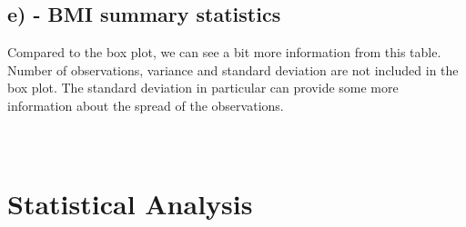 \documentclass{memoir}
\begin{document}
\section{e) - BMI summary statistics}

\begin{table}[!h]
\centering
\caption{BMI score summary statistics table}
\label{table 1.4}
\end{table}
Compared to the box plot, we can see a bit more information from this table. Number of observations, variance and standard deviation are not included in the box plot. The standard deviation in particular can provide some more information about the spread of the observations.
\clearpage

\chapter[Statistical Analysis]{\\ Statistical Analysis}
\end{document}
